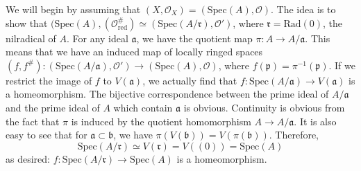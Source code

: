 \documentclass[aps,pra,showpacs,notitlepage,onecolumn,superscriptaddress,nofootinbib]{revtex4-1}
\theoremstyle{definition}
\begin{document}
        We will begin by assuming that $(X, \mathcal{O}_X) = (\text{Spec}(A), \mathcal{O})$.
        The idea is to show that $(\text{Spec}(A), (\mathcal{O}_{\text{red}}^{\#}) \simeq (\text{Spec}(A/\mathfrak{r}), \mathcal{O}')$, where $\mathfrak{r} = \text{Rad}(0)$, the nilradical of $A$. For any
        ideal $\mathfrak{a}$, we have the quotient map $\pi : A \rightarrow A/\mathfrak{a}$. This means that we have an induced map of locally ringed spaces
        $(f, f^{\#}) : (\text{Spec}(A/\mathfrak{a}), \mathcal{O}') \rightarrow (\text{Spec}(A), \mathcal{O})$, where $f(\mathfrak{p}) = \pi^{-1}(\mathfrak{p})$. If we restrict the image
        of $f$ to $V(\mathfrak{a})$, we actually find that $f : \text{Spec}(A/\mathfrak{a}) \rightarrow V(\mathfrak{a})$ is a homeomorphism. The bijective correspondence between the prime ideal of $A/\mathfrak{a}$ and the prime
        ideal of $A$ which contain $\mathfrak{a}$ is obvious. Continuity is obvious from the fact that $\pi$ is induced by the quotient homomorphism $A \rightarrow A/\mathfrak{a}$. It is also easy to see that
        for $\mathfrak{a} \subset \mathfrak{b}$, we have $\pi(V(\mathfrak{b})) = V(\pi(\mathfrak{b}))$. Therefore,
        \begin{equation}
        \text{Spec}(A/\mathfrak{r}) \simeq V(\mathfrak{r}) = V((0)) = \text{Spec}(A)
        \end{equation}
        as desired: $f : \text{Spec}(A/\mathfrak{r}) \rightarrow \text{Spec}(A)$ is a homeomorphism.
\end{document}
